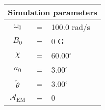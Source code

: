 \begin{tabular}{ccl}
\multicolumn{3}{c}{Simulation parameters} \\
\hline
$\omega_0$  &=& 100.0 rad/s\\
$B_0$  &=& $0$ G \\
$\chi$  &=& 60.00$^{\circ}$ \\
$a_0$ &=& 3.00$^{\circ}$ \\
$\tilde{\theta}$ &= & 3.00$^{\circ}$ \\
$\mathcal{A}_{\mathrm{EM}}$ &= & $0$
\end{tabular}